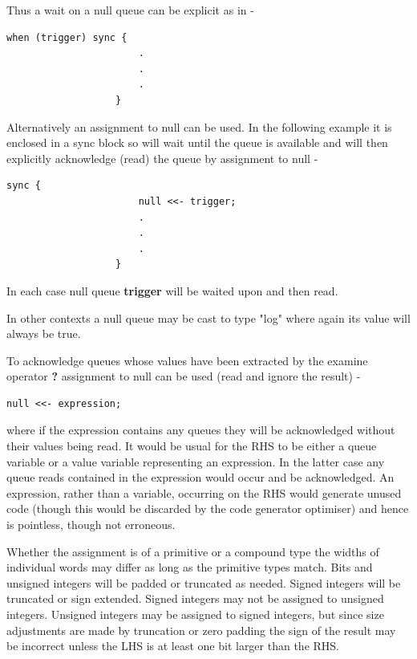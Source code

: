            Thus a wait on a null queue can be explicit as in -
            \begin{lstlisting}[gobble=12, language=threepl]
                   when (trigger) sync {
                       .
                       .
                       .
                   }
            \end{lstlisting}
            Alternatively an assignment to null can be used. In the following
            example it is enclosed in a sync block so will wait until the
            queue is available and will then explicitly acknowledge (read)
            the queue by assignment to null -
            \begin{lstlisting}[gobble=12, language=threepl]
                   sync {
                       null <<- trigger;
                       .
                       .
                       .
                   }
            \end{lstlisting}
            In each case null queue {\bf trigger} will be waited upon and
            then read.
            
            In other contexts a null queue may be cast to type "log" where
            again its value will always be true.

            To acknowledge queues whose values have been extracted by the
            examine operator {\bf ?} assignment to null can be used (read and
            ignore the result) -
            \begin{lstlisting}[gobble=12, language=threepl]
                   null <<- expression;
            \end{lstlisting}
            where if the expression contains any queues they will be
            acknowledged without their values being read. It would be usual
            for the RHS to be either a queue variable or a value variable
            representing an expression. In the latter case any queue reads
            contained in the expression would occur and be acknowledged.
            An expression, rather than a variable, occurring on the RHS
            would generate unused code (though this would be discarded by
            the code generator optimiser) and hence is pointless, though
            not erroneous.

            Whether the assignment is of a primitive or a compound type the
            widths of individual words may differ as long as the primitive
            types match. Bits and unsigned integers will be padded or
            truncated as needed. Signed integers will be truncated or sign
            extended. Signed integers may not be assigned to unsigned
            integers. Unsigned integers may be assigned to signed integers,
            but since size adjustments are made by truncation or zero
            padding the sign of the result may be incorrect unless the
            LHS is at least one bit larger than the RHS.








